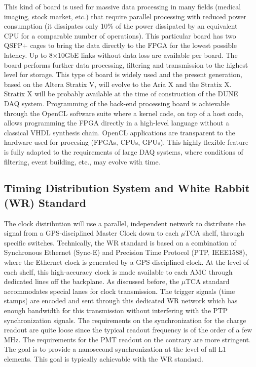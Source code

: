 This kind of board is used for massive data processing in many fields
(medical imaging, stock market, etc.) that require parallel
processing with reduced power consumption (it dissipates only 10\% of the power
dissipated by an equivalent CPU for a comparable number of
operations). This particular board has two QSFP+ cages to bring the
data directly to the FPGA for the lowest possible latency. Up to 8$\times$10GbE
links without data loss are available per board.  The board performs
further data processing, filtering and transmission to the highest
level for storage. This type of board is widely used and the present
generation, based on the Altera Stratix V, will evolve to the Aria X
and the Stratix X. Stratix X will be probably available at the time
of construction of the DUNE DAQ system. Programming of the back-end
processing board is achievable through the OpenCL software suite where
a kernel code, on top of a host code, allows programming  the FPGA directly in a
high-level language without a classical VHDL synthesis
chain. OpenCL applications are transparent to the hardware used for
procesing (FPGAs, CPUs, GPUs). This highly flexible feature is fully
adapted to the requirements of large DAQ systems, where conditions
of filtering, event building, etc., may evolve with time.
 
\subsection{Timing Distribution System and White Rabbit (WR) Standard}

The clock distribution will use a parallel, independent
network to distribute the signal from a GPS-disciplined Master Clock down to each $\mu$TCA
shelf, through specific switches. Technically, the WR standard is based
on a combination of Synchronous Ethernet (Sync-E) and Precision Time
Protocol (PTP, IEEE1588), where the Ethernet clock is generated by a
GPS-disciplined clock. At the level of each shelf, this high-accuracy
clock is made available to each AMC through dedicated lines off
the backplane. As discussed before, the $\mu$TCA standard accommodates
special lanes for clock transmission. The trigger signals
(time stamps) are encoded and sent through this dedicated WR network
which has enough bandwidth for this transmission without interfering
with the PTP synchronization signals. The requirements on the
synchronization for the charge readout are quite loose since the
typical readout frequency is of the order of a few MHz. The
requirements for the PMT readout on the contrary are more
stringent. The goal is to provide a nanosecond synchronization at the
level of all L1 elements. This goal is typically achievable with the
WR standard\cite{WR-standard}.


